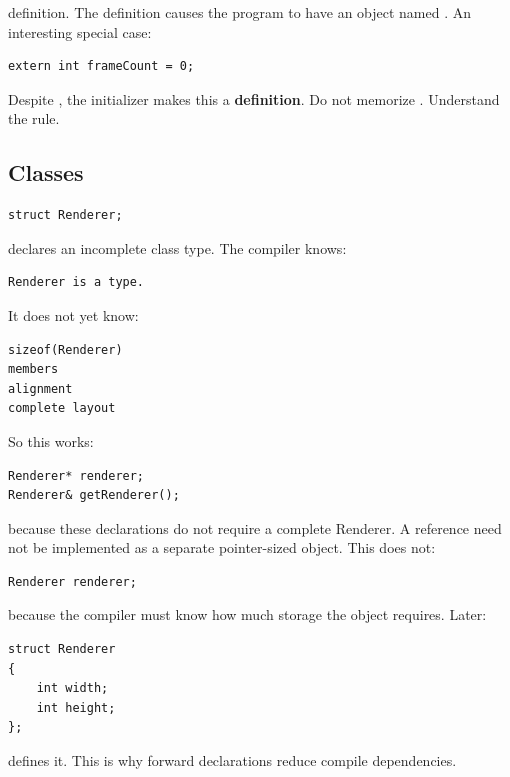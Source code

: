 definition. The definition causes the program to have an object named . An interesting special case:

\begin{verbatim}
extern int frameCount = 0;
\end{verbatim}

Despite , the initializer makes this a \textbf{definition}. Do not memorize . Understand the rule.

\subsection{Classes}\label{05-engine-i-ch002-classes}

\hypertarget{05-engine-i-ch002-classes}{}

\begin{verbatim}
struct Renderer;
\end{verbatim}

declares an incomplete class type. The compiler knows:

\begin{verbatim}
Renderer is a type.
\end{verbatim}

It does not yet know:

\begin{verbatim}
sizeof(Renderer)
members
alignment
complete layout
\end{verbatim}

So this works:

\begin{verbatim}
Renderer* renderer;
Renderer& getRenderer();
\end{verbatim}

because these declarations do not require a complete Renderer. A reference need not be implemented as a separate pointer-sized object. This does not:

\begin{verbatim}
Renderer renderer;
\end{verbatim}

because the compiler must know how much storage the object requires. Later:

\begin{verbatim}
struct Renderer
{
    int width;
    int height;
};
\end{verbatim}

defines it. This is why forward declarations reduce compile dependencies.


